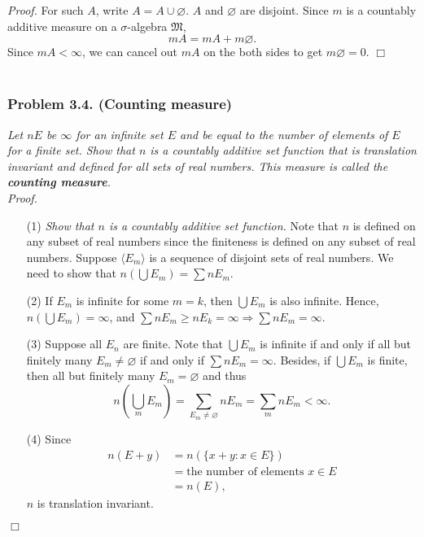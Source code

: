 \documentclass{article}
\begin{document}
\emph{Proof.}
For such $A$, write $A = A \cup \varnothing$.
$A$ and $\varnothing$ are disjoint.
Since $m$ is a countably additive measure
on a $\sigma$-algebra $\mathfrak{M}$,
\[
  mA = mA + m\varnothing.
\]
Since $mA < \infty$,
we can cancel out $mA$ on the both sides to get
$m\varnothing = 0$.
$\Box$ \\\\






\subsubsection*{Problem 3.4. (Counting measure)}
\emph{Let $nE$ be $\infty$ for an infinite set $E$ and
be equal to the number of elements of $E$ for a finite set.
Show that $n$ is a countably additive set function that is translation invariant and
defined for all sets of real numbers.
This measure is called the \textbf{counting measure}.} \\



\emph{Proof.}
\begin{enumerate}
\item[(1)]
  \emph{Show that $n$ is a countably additive set function.}
  Note that $n$ is defined on any subset of real numbers
  since the finiteness is defined on any subset of real numbers.
  Suppose $\langle E_m \rangle$ is a sequence of disjoint sets of real numbers.
  We need to show that $n\left( \bigcup E_m \right) = \sum n E_m$.

\item[(2)]
  If $E_m$ is infinite for some $m = k$, then $\bigcup E_m$ is also infinite.
  Hence, $n \left( \bigcup E_m \right) = \infty$,
  and $\sum n E_m \geq n E_k = \infty \Longrightarrow \sum n E_m = \infty$.

\item[(3)]
  Suppose all $E_n$ are finite.
  Note that
  $\bigcup E_m$ is infinite if and only if all but finitely many $E_m \neq \varnothing$
  if and only if $\sum n E_m = \infty$.
  Besides, if $\bigcup E_m$ is finite, then all but finitely many $E_m = \varnothing$
  and thus
  \[
    n\left( \bigcup_m E_m \right)
    = \sum_{E_m \neq \varnothing} n E_m
    = \sum_{m} n E_m
    < \infty.
  \]

\item[(4)]
  Since
  \begin{align*}
    n(E+y)
    &= n(\{ x + y : x \in E\}) \\
    &= \text{the number of elements $x \in E$} \\
    &= n(E),
  \end{align*}
  $n$ is translation invariant.
\end{enumerate}
$\Box$ \\\\
\end{document}
